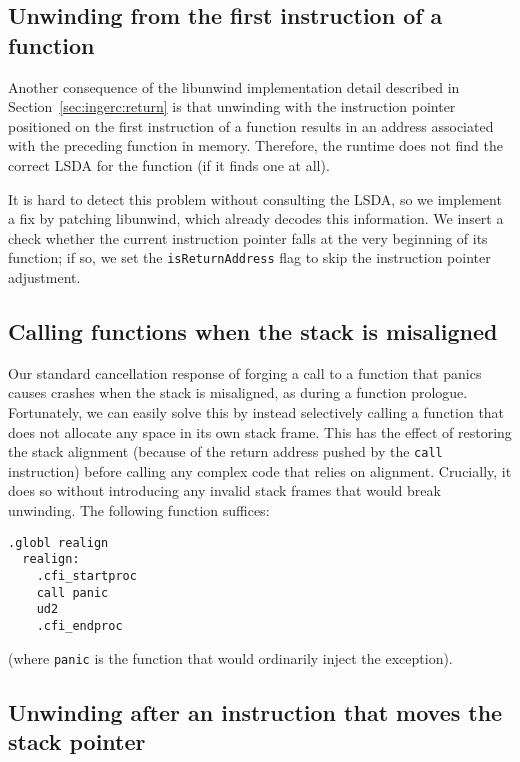 \subsection{Unwinding from the first instruction of a function}
\label{sec:ingerc:start}

Another consequence of the libunwind implementation detail described in
Section~\ref{sec:ingerc:return} is that unwinding with the instruction pointer
positioned on the first instruction of a function results in an address associated
with the preceding function in memory.  Therefore, the runtime does not find the
correct LSDA for the function (if it finds one at all).

It is hard to detect this problem without consulting the LSDA, so we implement a fix
by patching libunwind, which already decodes this information.  We insert a check
whether the current instruction pointer falls at the very beginning of its function;
if so, we set the \texttt{isReturnAddress} flag to skip the instruction pointer
adjustment.


\subsection{Calling functions when the stack is misaligned}
\label{sec:ingerc:realign}

Our standard cancellation response of forging a call to a function that panics
causes crashes when the stack is misaligned, as during a function
prologue.  Fortunately, we can easily solve this by instead selectively calling a
function that does not allocate any space in its own stack frame.  This has the
effect of restoring the stack alignment (because of the return address pushed by the
\texttt{call} instruction) before calling any complex code that relies on alignment.
Crucially, it does so without introducing any invalid stack frames that would break
unwinding.  The following function suffices:
\begin{lstlisting}[language={[x86masm]Assembler},morekeywords=ud2]
  	.globl realign
  realign:
  	.cfi_startproc
  	call panic
  	ud2
  	.cfi_endproc
\end{lstlisting}

\noindent
(where \texttt{panic} is the function that would ordinarily inject the exception).


\subsection{Unwinding after an instruction that moves the stack pointer}
\label{sec:ingerc:boundary}


